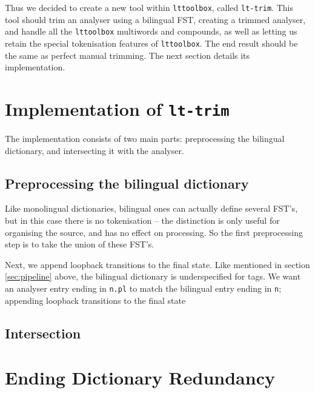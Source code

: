 \documentclass[10pt, a4paper]{article}
\newcommand{\ana}[1]{\texttt{#1}}
\newcommand{\tool}[1]{\texttt{#1}}
\begin{document}
Thus we decided to create a new tool within \tool{lttoolbox}, called
\tool{lt-trim}. This tool should trim an analyser using a bilingual
FST, creating a trimmed analyser, and handle all the \tool{lttoolbox}
multiwords and compounds, as well as letting us retain the special
tokenisation features of \tool{lttoolbox}. The end result should be
the same as perfect manual trimming. The next section details its
implementation.


\section{Implementation of \tool{lt-trim}}
The implementation consists of two main parts: preprocessing the
bilingual dictionary, and intersecting it with the analyser. 


\subsection{Preprocessing the bilingual dictionary}
Like monolingual dictionaries, bilingual ones can actually define
several FST's, but in this case there is no tokenisation -- the
distinction is only useful for organising the source, and has no
effect on processing. So the first preprocessing step is to take the
union of these FST's.

Next, we append loopback transitions to the final state. Like mentioned
in section \ref{sec:pipeline} above, the bilingual dictionary is
underspecified for tags. We want an analyser entry ending in \ana{n.pl} to
match the bilingual entry ending in \ana{n}; appending loopback
transitions to the final state

\subsection{Intersection}



\section{Ending Dictionary Redundancy}
\end{document}
